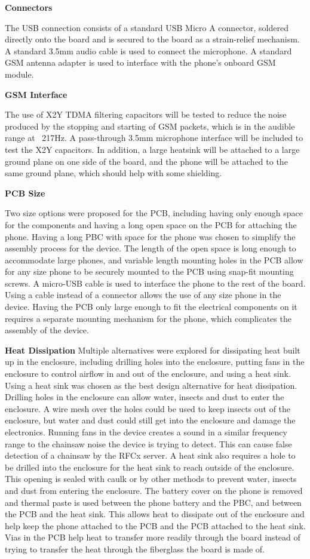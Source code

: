 \documentclass{article}
\begin{document}
{\textbf{Connectors}

The USB connection consists of a standard USB Micro A connector, soldered directly onto the board and is secured to the board as a strain-relief mechanism. A standard 3.5mm audio cable is used to connect the microphone. A standard GSM antenna adapter is used to interface with the phone’s onboard GSM module.

\textbf{GSM Interface}

The use of X2Y TDMA filtering capacitors will be tested to reduce the noise produced by the stopping and starting of GSM packets, which is in the audible range at ~217Hz. A pass-through 3.5mm microphone interface will be included to test the X2Y capacitors. In addition, a large heatsink will be attached to a large ground plane on one side of the board, and the phone will be attached to the same ground plane, which should help with some shielding.

\textbf{PCB Size}

Two size options were proposed for the PCB, including having only enough space for the components and having a long open space on the PCB for attaching the phone. Having a long PBC with space for the phone was chosen to simplify the assembly process for the device. The length of the open space is long enough to accommodate large phones, and variable length mounting holes in the PCB allow for any size phone to be securely mounted to the PCB using snap-fit mounting screws. A micro-USB cable is used to interface the phone to the rest of the board. Using a cable instead of a connector allows the use of any size phone in the device. Having the PCB only large enough to fit the electrical components on it requires a separate mounting mechanism for the phone, which complicates the assembly of the device.

\textbf{Heat Dissipation}
Multiple alternatives were explored for dissipating heat built up in the enclosure, including drilling holes into the enclosure, putting fans in the enclosure to control airflow in and out of the enclosure, and using a heat sink. Using a heat sink was chosen as the best design alternative for heat dissipation. Drilling holes in the enclosure can allow water, insects and dust to enter the enclosure. A wire mesh over the holes could be used to keep insects out of the enclosure, but water and dust could still get into the enclosure and damage the electronics. Running fans in the device creates a sound in a similar frequency range to the chainsaw noise the device is trying to detect. This can cause false detection of a chainsaw by the RFCx server. A heat sink also requires a hole to be drilled into the enclosure for the heat sink to reach outside of the enclosure. This opening is sealed with caulk or by other methods to prevent water, insects and dust from entering the enclosure. The battery cover on the phone is removed and thermal paste is used between the phone battery and the PBC, and between the PCB and the heat sink. This allows heat to dissipate out of the enclosure and help keep the phone attached to the PCB and the PCB attached to the heat sink. Vias in the PCB help heat to transfer more readily through the board instead of trying to transfer the heat through the fiberglass the board is made of.

}
\end{document}
